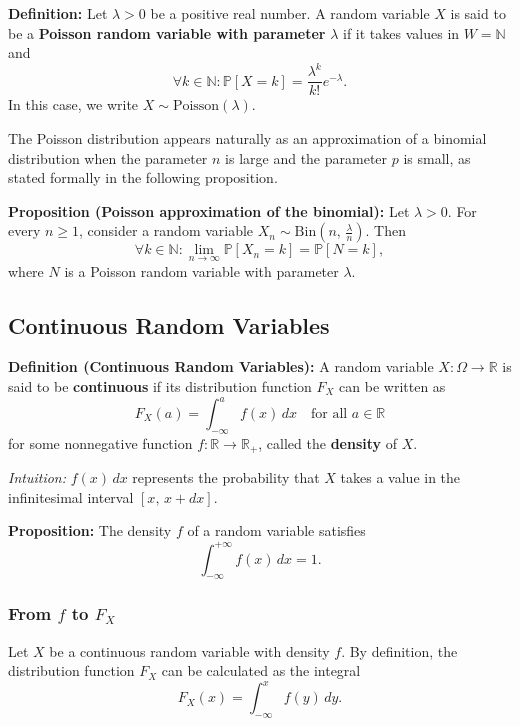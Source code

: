 \documentclass[a4paper]{extarticle}
\begin{document}
\textbf{Definition:} Let \(\lambda > 0\) be a positive real number. A random variable \(X\) is said to be a \textbf{Poisson random variable with parameter} \(\lambda\) if it takes values in \(W = \mathbb{N}\) and
\[
    \forall k \in \mathbb{N} : \mathbb{P}[X = k] = \frac{\lambda^k}{k!}e^{- \lambda}.
\]
In this case, we write \(X \sim \text{Poisson}(\lambda)\).

The Poisson distribution appears naturally as an approximation of a binomial distribution when the parameter \(n\) is large and the parameter \(p\) is small, as stated formally in the following proposition.

\begin{cbox}
    \textbf{Proposition (Poisson approximation of the binomial):} Let \(\lambda > 0\). For every \(n \geq 1\), consider a random variable \(X_n \sim \text{Bin}(n, \, \frac{\lambda}{n})\). Then
    \[
        \forall k \in \mathbb{N} : \lim_{n \to \infty} \mathbb{P}[X_n = k] = \mathbb{P}[N = k],
    \]
    where \(N\) is a Poisson random variable with parameter \(\lambda\).
\end{cbox}

\subsection{Continuous Random Variables}

\textbf{Definition (Continuous Random Variables):} A random variable \(X : \Omega \to \mathbb{R}\) is said to be \textbf{continuous} if its distribution function \(F_X\) can be written as
\[
    F_X(a) = \int_{- \infty}^a f(x) \, dx \quad \text{for all } a \in \mathbb{R}
\]
for some nonnegative function \(f : \mathbb{R} \to \mathbb{R}_+\), called the \textbf{density} of \(X\).

\textit{Intuition:} \(f(x) \, dx\) represents the probability that \(X\) takes a value in the infinitesimal interval \([x, \, x + dx]\).

\begin{cbox}
    \textbf{Proposition:} The density \(f\) of a random variable satisfies
    \[
        \int_{- \infty}^{+ \infty} f(x) \, dx = 1.
    \]
\end{cbox}

\subsubsection{From \(f\) to \(F_X\)}

Let \(X\) be a continuous random variable with density \(f\). By definition, the distribution function \(F_X\) can be calculated as the integral
\[
    F_X(x) = \int_{- \infty}^{x} f(y) \, dy.
\]
\end{document}
